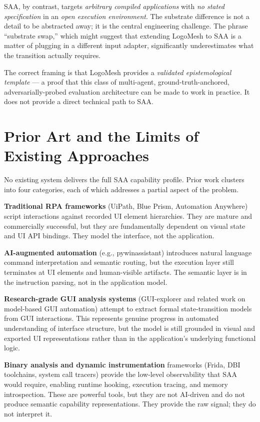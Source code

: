 \documentclass[11pt, a4paper]{article}
\begin{document}
SAA, by contrast, targets \emph{arbitrary compiled applications} with \emph{no stated specification} in an \emph{open execution environment}. The substrate difference is not a detail to be abstracted away; it is the central engineering challenge. The phrase ``substrate swap,'' which might suggest that extending LogoMesh to SAA is a matter of plugging in a different input adapter, significantly underestimates what the transition actually requires.

The correct framing is that LogoMesh provides a \emph{validated epistemological template} — a proof that this class of multi-agent, ground-truth-anchored, adversarially-probed evaluation architecture can be made to work in practice. It does not provide a direct technical path to SAA.

\section{Prior Art and the Limits of Existing Approaches}

No existing system delivers the full SAA capability profile. Prior work clusters into four categories, each of which addresses a partial aspect of the problem.

\textbf{Traditional RPA frameworks} (UiPath, Blue Prism, Automation Anywhere) script interactions against recorded UI element hierarchies. They are mature and commercially successful, but they are fundamentally dependent on visual state and UI API bindings. They model the interface, not the application.

\textbf{AI-augmented automation} (e.g., pywinassistant) introduces natural language command interpretation and semantic routing, but the execution layer still terminates at UI elements and human-visible artifacts. The semantic layer is in the instruction parsing, not in the application model.

\textbf{Research-grade GUI analysis systems} (GUI-explorer and related work on model-based GUI automation) attempt to extract formal state-transition models from GUI interactions. This represents genuine progress in automated understanding of interface structure, but the model is still grounded in visual and exported UI representations rather than in the application's underlying functional logic.

\textbf{Binary analysis and dynamic instrumentation} frameworks (Frida, DBI toolchains, system call tracers) provide the low-level observability that SAA would require, enabling runtime hooking, execution tracing, and memory introspection. These are powerful tools, but they are not AI-driven and do not produce semantic capability representations. They provide the raw signal; they do not interpret it.
\end{document}
